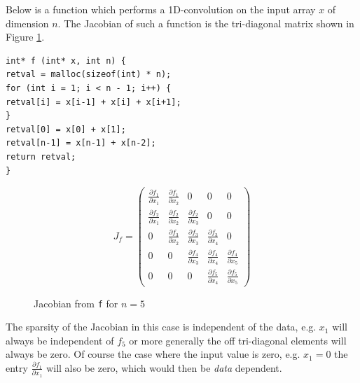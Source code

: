 Below is a function which performs a 1D-convolution on the input array $x$ of dimension $n$. 
The Jacobian of such a function is the tri-diagonal matrix shown in Figure \ref{fig:tridiag}. 
\begin{verbatim}
int* f (int* x, int n) {
retval = malloc(sizeof(int) * n);
for (int i = 1; i < n - 1; i++) {
retval[i] = x[i-1] + x[i] + x[i+1];
}
retval[0] = x[0] + x[1];
retval[n-1] = x[n-1] + x[n-2];
return retval;
}
\end{verbatim}
\begin{figure}[H]
	$$ J_{f} = \left(\begin{matrix}
	\frac{\partial f_1}{\partial x_1} & \frac{\partial f_1}{\partial x_2} & 0 & 0 & 0 \\
	\frac{\partial f_2}{\partial x_1}& \frac{\partial f_2}{\partial x_2} & \frac{\partial f_2}{\partial x_3} & 0 & 0\\
	0 & \frac{\partial f_3}{\partial x_2} & \frac{\partial f_3}{\partial x_3} & \frac{\partial f_3}{\partial x_4} & 0\\
	0 & 0 & \frac{\partial f_4}{\partial x_3} & \frac{\partial f_4}{\partial x_4} & \frac{\partial f_4}{\partial x_5} \\
	0 & 0 & 0 & \frac{\partial f_5}{\partial x_4} & \frac{\partial f_5}{\partial x_5}
	\end{matrix}\right) $$
	\caption{Jacobian from \texttt{f} for $n=5$}
	\label{fig:tridiag}
\end{figure}
The sparsity of the Jacobian in this case is independent of the data, e.g. $x_1$ will always be independent of $f_5$ 
or more generally the off tri-diagonal elements will always be zero. 
Of course the case where the input value is zero, e.g. $x_1 = 0$  the entry $\frac{\partial f_1}{\partial x_1}$ will also be zero, 
which would then be \emph{data} dependent.

